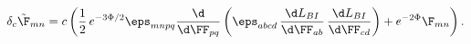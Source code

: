 \begin{equation}
\delta_c {\tilde \F}_{mn} = c\left(
  \frac{1}{2}\,e^{-3\Phi/2}\eps_{mnpq} \frac{\d}{\d\FF_{pq}}\left(
    \eps_{abcd}\,\frac{\d L_{BI}}{\d\FF_{ab}}\,\frac{\d L_{BI}}{\d\FF_{cd}}
  \right) + e^{-2\Phi}\F_{mn}\right).
\end{equation}

